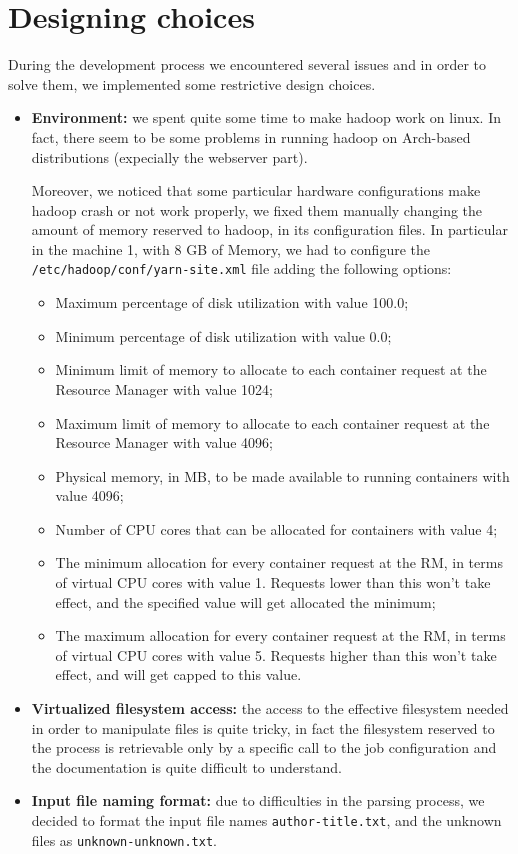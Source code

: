 \documentclass[a4paper,11pt, twoside]{article}
\begin{document}
	\clearpage
	
	\section{Designing choices}\label{designing choices}
	During the development process we encountered several issues and in order to solve them, we implemented some restrictive design choices.
	
	\begin{itemize}
		\item \textbf{Environment:} we spent quite some time to make hadoop work on linux. In fact, there seem to be some problems in running hadoop on Arch-based distributions (expecially the webserver part). 
		
		Moreover, we noticed that some particular hardware configurations make hadoop crash or not work properly, we fixed them manually changing the amount of memory reserved to hadoop, in its configuration files. In particular in the machine 1, with 8 GB of Memory, we had to configure the \texttt{/etc/hadoop/conf/yarn-site.xml} file adding the following options: 
		\begin{itemize}
			\item Maximum percentage of disk utilization with value 100.0;
			\item Minimum percentage of disk utilization with value 0.0;
			\item Minimum limit of memory to allocate to each container request at the Resource Manager with value 1024;
			\item Maximum limit of memory to allocate to each container request at the Resource Manager with value 4096;
			\item Physical memory, in MB, to be made available to running containers with value 4096;
			\item Number of CPU cores that can be allocated for containers with value 4;
			\item The minimum allocation for every container request at the RM, in terms of virtual CPU cores with value 1. Requests lower than this won't take effect, and the specified value will get allocated the minimum;
			\item The maximum allocation for every container request at the RM, in terms of virtual CPU cores with value 5. Requests higher than this won't take effect, and will get capped to this value.
		\end{itemize}
		
		\item \textbf{Virtualized filesystem access:} the access to the effective filesystem needed in order to manipulate files is quite tricky, in fact the filesystem reserved to the process is retrievable only by a specific call to the job configuration and the documentation is quite difficult to understand.
		
		\item \textbf{Input file naming format:} due to difficulties in the parsing process, we decided to format the input file names \texttt{author-title.txt}, and the unknown files as \texttt{unknown-unknown.txt}.
	\end{itemize}
\end{document}

